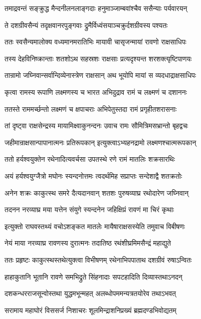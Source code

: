 \twolineshloka
{तमाद्रवन्तं सङ्क्रुद्ध मैन्दनीलनलाङ्गदाः}
{हनुमाञ्जाम्बवांश्चैव ससैन्याः पर्यवारयन्}


\twolineshloka
{ते दशग्रीवसैन्यं तदृक्षवानरपुङ्गवाः}
{द्रुमैर्विध्वंसयाञ्चक्रुर्दशग्रीवस्य पश्यतः}


\twolineshloka
{ततः स्वसैन्यमालोक्य वध्यमानमरातिभिः}
{मायावी चासृजन्मायां रावणो राक्षसाधिपः}


\twolineshloka
{तस्य देहविनिष्क्रान्ताः शतशोऽथ सहस्रशः}
{राक्षसाः प्रत्यदृश्यन्त शरशक्त्यृष्टिपाणयः}


\twolineshloka
{तान्रामो जघ्निवान्सर्वान्दिव्येनास्त्रेण राक्षसान्}
{अथ भूयोपि मायां स व्यदधाद्राक्षसाधिपः}


\twolineshloka
{कृत्वा रामस्य रूपाणि लक्ष्मणस्य च भारत}
{अभिदुद्राव रामं च लक्ष्मणं च दशाननः}


\twolineshloka
{ततस्ते राममर्च्छन्तो लक्ष्मणं च क्षपाचराः}
{अभिपेतुस्तदा रामं प्रगृहीतशरासनाः}


\twolineshloka
{तां दृष्ट्वा राक्षसेन्द्रस्य मायामिक्ष्वाकुनन्दनः}
{उवाच रामः सौमित्रिमसभ्रान्तो बृहद्वचः}


\twolineshloka
{जहीमान्राक्षसान्पापानात्मनः प्रतिरूपकान्}
{इत्युक्त्वाऽभ्यहनद्रामो लक्ष्मणश्चात्मरूपकान्}


\twolineshloka
{ततो हर्यश्वयुक्तेन रथेनादित्यवर्चसा}
{उपतस्थे रणे रामं मातलिः शक्रसारथिः}



\twolineshloka
{अयं हर्यश्वयुग्जैत्रो मघोनः स्यन्दनोत्तमः}
{त्वदर्थमिह सप्राप्तः सन्देशाद्वै शतक्रतोः}


\twolineshloka
{अनेन शक्रः काकुत्स्थ समरे दैत्यदानवान्}
{शतशः पुरुषव्याघ्र रथोदारेण जघ्निवान्}


\twolineshloka
{तदनन नरव्याघ्र मया यत्तेन संयुगे}
{स्यन्दनेन जहिक्षिप्रं रावणं मा चिरं कृथाः}


\twolineshloka
{इत्युक्तो राघवस्तथ्यं वचोऽशङ्कत मातलेः}
{मायैषाराक्षसस्येति तमुवाच विबीषणः}


\twolineshloka
{नेयं माया नरव्याघ्र रावणस्य दुरात्मनः}
{तदातिष्ठ रथंशीघ्रमिमसैन्द्रं महाद्युते}


\twolineshloka
{ततः प्रहृष्टः काकुत्स्थस्तथेत्युक्त्वा विभीषणम्}
{रथेनाभिपपाताथ दशग्रीवं रुषाऽन्वितः}


\twolineshloka
{हाहाकुतानि भूतानि रावणे समभिद्रुते}
{सिंहनादाः सपटहादिति दिव्यास्तथाऽनदन्}


\twolineshloka
{दशकन्धरराजसून्वोस्तथा युद्धमभून्महत्}
{अलब्धोपममन्यत्रतयोरेव तथाऽभवत्}


\twolineshloka
{सरामाय महाघोरं विससर्ज निशाचरः}
{शूलमिन्द्राशनिप्रख्यं ब्रह्मदण्डभिवोद्यतम्}



